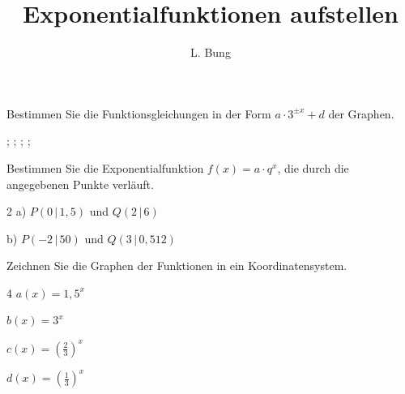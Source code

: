 \documentclass[11pt, a4paper, oneside]{article}
\begin{document}
	\author{L. Bung}
	\title{Exponentialfunktionen \hspace{10cm} aufstellen}
	\subject{Mathematik}
	\maketitle
	
	
	Bestimmen Sie die Funktionsgleichungen in der Form $a \cdot 3^{\pm x} + d$ der Graphen.
	
	\begin{plot}[xmin=-4, xmax=5, ymin=-3, ymax=4.5]
		;
		;
		;
		;
	\end{plot}
	
	\checkered[9cm]
	
	
	Bestimmen Sie die Exponentialfunktion $f(x)=a \cdot q^x$, die durch die angegebenen Punkte verläuft.
	
	\begin{multicols}{2}
		a) $P(0\,|\,1,5)$ und $Q(2\,|\,6)$
		
		b) $P(-2\,|\,50)$ und $Q(3\,|\,0,512)$
	\end{multicols}
	
	\checkered[6cm]
	
	
	Zeichnen Sie die Graphen der Funktionen in ein Koordinatensystem.
	
	\begin{multicols}{4}
		$a(x) = 1,5^x$
		
		$b(x) = 3^x$
		
		$c(x) = \left(\frac{2}{3}\right)^x$
		
		$d(x) = \left(\frac{1}{3}\right)^x$
	\end{multicols}
	
	\checkered[8cm]
	
\end{document}
